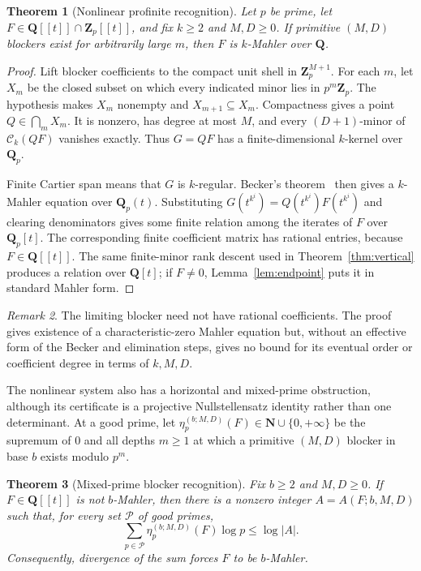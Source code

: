 \documentclass[11pt,reqno]{amsart}
\newtheorem{theorem}{Theorem}[section]
\theoremstyle{definition}
\theoremstyle{remark}
\newtheorem{remark}[theorem]{Remark}
\newcommand{\N}{\mathbf N}
\newcommand{\Q}{\mathbf Q}
\newcommand{\Zp}{\mathbf Z_p}
\newcommand{\Qp}{\mathbf Q_p}
\begin{document}
\begin{theorem}[Nonlinear profinite recognition]\label{thm:blocker}
Let $p$ be prime, let $F\in\Q[[t]]\cap\Zp[[t]]$, and fix
$k\geq2$ and $M,D\geq0$.  If primitive $(M,D)$ blockers exist for
arbitrarily large $m$, then $F$ is $k$-Mahler over $\Q$.
\end{theorem}

\begin{proof}
Lift blocker coefficients to the compact unit shell in $\Zp^{M+1}$.  For
each $m$, let $X_m$ be the closed subset on which every indicated minor lies
in $p^m\Zp$.  The hypothesis makes $X_m$ nonempty and
$X_{m+1}\subseteq X_m$.  Compactness gives a point
$Q\in\bigcap_mX_m$.  It is nonzero, has degree at most $M$, and every
$(D+1)$-minor of $\mathcal C_k(QF)$ vanishes exactly.  Thus
$G=QF$ has a finite-dimensional $k$-kernel over $\Qp$.

Finite Cartier span means that $G$ is $k$-regular.  Becker's
theorem~\cite[Theorem~1]{becker} then gives a $k$-Mahler equation over
$\Qp(t)$.  Substituting $G(t^{k^i})=Q(t^{k^i})F(t^{k^i})$ and clearing
denominators gives some finite relation among the iterates of $F$ over
$\Qp[t]$.  The corresponding finite coefficient matrix has rational entries,
because $F\in\Q[[t]]$.  The same finite-minor rank descent used in
Theorem~\ref{thm:vertical} produces a relation over $\Q[t]$; if $F\ne0$,
Lemma~\ref{lem:endpoint} puts it in standard Mahler form.
\end{proof}

\begin{remark}
The limiting blocker need not have rational coefficients.  The proof gives
existence of a characteristic-zero Mahler equation but, without an effective
form of the Becker and elimination steps, gives no bound for its eventual
order or coefficient degree in terms of $k,M,D$.
\end{remark}

The nonlinear system also has a horizontal and mixed-prime obstruction,
although its certificate is a projective Nullstellensatz identity rather
than one determinant.  At a good prime, let
$\eta_p^{(b;M,D)}(F)\in\N\cup\{0,+\infty\}$ be the supremum of $0$ and all
depths $m\geq1$ at which a primitive $(M,D)$ blocker in base $b$ exists
modulo $p^m$.

\begin{theorem}[Mixed-prime blocker recognition]\label{thm:mixed-blocker}
Fix $b\geq2$ and $M,D\geq0$.  If $F\in\Q[[t]]$ is not $b$-Mahler, then
there is a nonzero integer $A=A(F;b,M,D)$ such that, for every set
$\mathcal P$ of good primes,
\begin{equation}\label{eq:blocker-budget}
 \sum_{p\in\mathcal P}\eta_p^{(b;M,D)}(F)\log p\leq\log|A|.
\end{equation}
Consequently, divergence of the sum forces $F$ to be $b$-Mahler.
\end{theorem}
\end{document}
